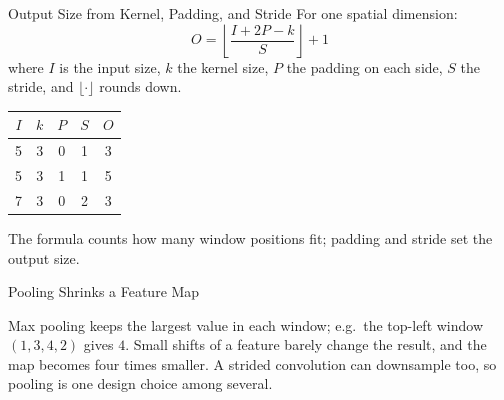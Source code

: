 \documentclass{ntuabeamer}
\begin{document}
\begin{frame}{Output Size from Kernel, Padding, and Stride}
  For one spatial dimension:
  \[
    \boxed{
      O=\left\lfloor
      \frac{I+2P-k}{S}
      \right\rfloor+1
    }
  \]
  where $I$ is the input size, $k$ the kernel size, $P$ the padding on each side, $S$ the stride,
  and $\lfloor\cdot\rfloor$ rounds down.
  \begin{center}
    \begin{tabular}{cccc|c}
      \toprule
      $I$ & $k$ & $P$ & $S$ & $O$\\
      \midrule
      5 & 3 & 0 & 1 & 3\\
      5 & 3 & 1 & 1 & 5\\
      7 & 3 & 0 & 2 & 3\\
      \bottomrule
    \end{tabular}
  \end{center}
  The formula counts how many window positions fit; padding and stride set the output size.
\end{frame}


\begin{frame}{Pooling Shrinks a Feature Map}
  \centering

  \vspace{0.1cm}
  Max pooling keeps the largest value in each window; e.g.\ the top-left window $(1,3,4,2)$ gives $4$.
  Small shifts of a feature barely change the result, and the map becomes four times smaller.
  A strided convolution can downsample too, so pooling is one design choice among several.
\end{frame}
\end{document}
